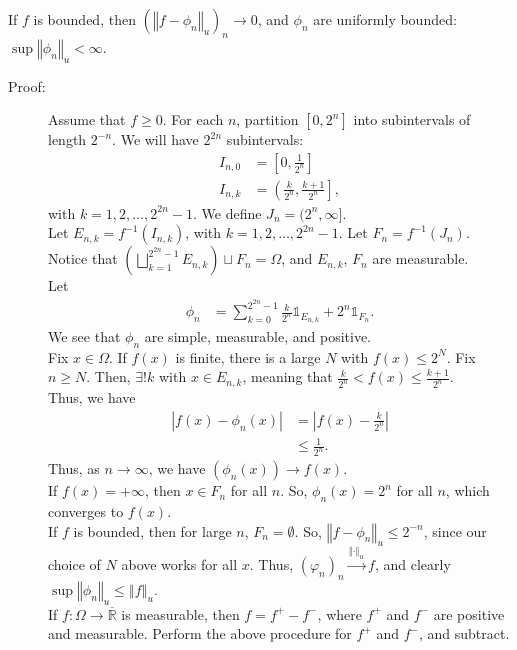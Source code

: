 \documentclass[10pt]{extarticle}
\newcommand{\R}{\mathbb{R}}
\newcommand{\norm}[1]{\left\Vert #1 \right\Vert}
\begin{document}
  If $f$ is bounded, then $\left(\norm{f-\phi_n}_u\right)_n \rightarrow 0$, and $\phi_n$ are uniformly bounded: $\sup \norm{\phi_n}_u < \infty$.
  \begin{description}
    \item[Proof:] Assume that $f \geq 0$. For each $n$, partition $[0,2^n]$ into subintervals of length $2^{-n}$. We will have $2^{2n}$ subintervals:
      \begin{align*}
        I_{n,0} &= \left[0,\frac{1}{2^n}\right]\\
        I_{n,k} &= \left(\frac{k}{2^n},\frac{k+1}{2^n}\right],
      \end{align*}
      with $k = 1,2,\dots,2^{2n}-1$. We define $J_n = (2^n,\infty]$.\\

      Let $E_{n,k} = f^{-1}(I_{n,k})$, with $k = 1,2,\dots,2^{2n}-1$. Let $F_n = f^{-1}(J_n)$.\\

      Notice that $\displaystyle \left(\bigsqcup_{k=1}^{2^{2n}-1} E_{n,k}\right) \sqcup F_n = \Omega$, and $E_{n,k}$, $F_n$ are measurable.\\

      Let
      \begin{align*}
        \phi_n &= \sum_{k=0}^{2^{2n}-1} \frac{k}{2^n}\mathbb{1}_{E_{n,k}} + 2^n \mathbb{1}_{F_n}.
      \end{align*}
      We see that $\phi_n$ are simple, measurable, and positive.\\

      Fix $x \in \Omega$. If $f(x)$ is finite, there is a large $N$ with $f(x) \leq 2^N$. Fix $n\geq N$. Then, $\exists ! k$ with $x\in E_{n,k}$, meaning that $\frac{k}{2^n} < f(x) \leq \frac{k+1}{2^n}$.\\

      Thus, we have
      \begin{align*}
        |f(x) - \phi_n(x)| &= \left|f(x) - \frac{k}{2^n}\right|\\
                           &\leq \frac{1}{2^n}.
      \end{align*}
      Thus, as $n\rightarrow \infty$, we have $\left(\phi_n(x)\right) \rightarrow f(x)$.\\

      If $f(x) = +\infty$, then $x\in F_n$ for all $n$. So, $\phi_n(x) = 2^n$ for all $n$, which converges to $f(x)$.\\

      If $f$ is bounded, then for large $n$, $F_n = \emptyset$. So, $\norm{f-\phi_n}_u \leq 2^{-n}$, since our choice of $N$ above works for all $x$. Thus, $(\varphi_n)_n \xrightarrow{\norm{\cdot}_u}f$, and clearly $\sup\norm{\phi_n}_u \leq \norm{f}_u$.\\

      If $f: \Omega \rightarrow \overline{\R}$ is measurable, then $f = f^{+} - f^{-}$, where $f^{+}$ and $f^{-}$ are positive and measurable. Perform the above procedure for $f^{+}$ and $f^{-}$, and subtract.
  \end{description}
\end{document}
